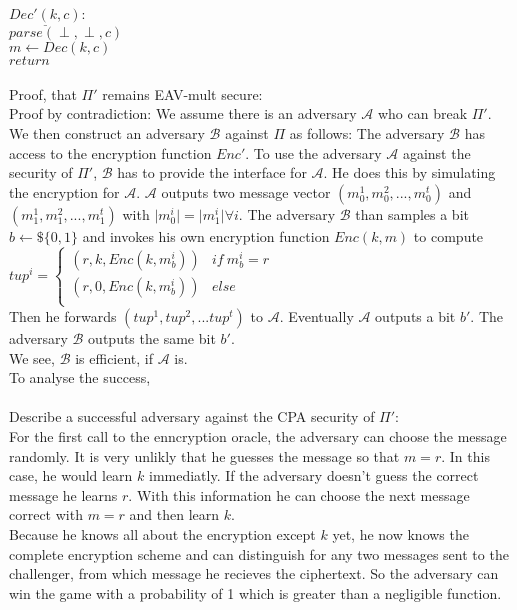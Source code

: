 \noindent \(\underline{Dec'(k, c)}:\)\\
\(parse(\perp, \perp, c)\)\\
\(m \leftarrow  Dec(k,c)\)\\
\(return\)\\
\\
Proof, that \(\Pi'\) remains EAV-mult secure:\\
Proof by contradiction: We assume there is an adversary \(\mathcal{A}\) who can break \(\Pi'\). We then construct an adversary \(\mathcal{B}\) against \(\Pi\) as follows: The adversary \(\mathcal{B}\) has access to the encryption function \(Enc'\). To use the adversary \(\mathcal{A}\) against the security of \(\Pi'\), \(\mathcal{B}\) has to provide the interface for \(\mathcal{A}\). He does this by simulating the encryption for \(\mathcal{A}\). \(\mathcal{A}\) outputs two message vector  \((m_0^1, m_0^2,..., m_0^t)\) and \((m_1^1, m_1^2,..., m_1^t)\) with \(\vert m_0^i \vert = \vert m_1^i \vert \forall i\). The adversary \(\mathcal{B}\) than samples a bit \(b \leftarrow\$ \{0,1\}\) and invokes his own encryption function \(Enc(k,m)\) to compute \(tup^i = \left\{
\begin{array}{ll}
	(r,k, Enc(k,m_b^i)) & if\ m_b^i = r\\
	(r, 0, Enc(k,m_b^i)) & else\\
\end{array}
\right.	\)\\
Then he forwards \(\left(tup^1, tup^2, ... tup^t\right)\) to \(\mathcal{A}\). Eventually \(\mathcal{A}\) outputs a bit \(b'\). The adversary \(\mathcal{B}\) outputs the same bit \(b'\).\\
We see, \(\mathcal{B}\) is efficient, if \(\mathcal{A}\) is. \\
To analyse the success, \\
\\
Describe a successful adversary against the CPA security of \(\Pi'\):\\
For the first call to the enncryption oracle, the adversary can choose the message randomly. It is very unlikly that he guesses the message so that \(m = r\). In this case, he would learn \(k\) immediatly. If the adversary doesn't guess the correct message he learns \(r\). With this information he can choose the next message correct with \(m = r\) and then learn \(k\). \\
Because he knows all about the encryption except \(k\) yet, he now knows the complete encryption scheme and can distinguish for any two messages sent to the challenger, from which message he recieves the ciphertext. So the adversary can win the game with a probability of 1 which is greater than a negligible function.